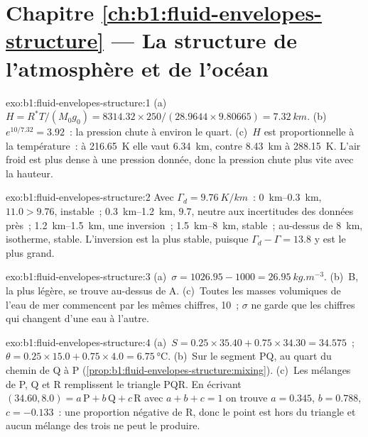 \section*{Chapitre \ref{ch:b1:fluid-envelopes-structure} --- La structure de l'atmosphère et de l'océan}

\begin{solution}{exo:b1:fluid-envelopes-structure:1}
(a)~$H = R^*T/(M_0 g_0) = 8314.32 \times 250/(28.9644 \times 9.80665) =
\qty{7.32}{km}$. (b)~$e^{10/7.32} = 3.92$~: la pression chute à environ le quart.
(c)~$H$ est proportionnelle à la température~: à \qty{216.65}{K} elle vaut
\qty{6.34}{km}, contre \qty{8.43}{km} à \qty{288.15}{K}. L'air froid est plus dense à
une pression donnée, donc la pression chute plus vite avec la hauteur.
\end{solution}

\begin{solution}{exo:b1:fluid-envelopes-structure:2}
Avec $\Gamma_d = \qty{9.76}{K/km}$~: \qtyrange{0}{0.3}{km}, $11.0 > 9.76$,
instable~; \qtyrange{0.3}{1.2}{km}, $9.7$, neutre aux incertitudes des
données près~; \qtyrange{1.2}{1.5}{km}, une inversion~; \qtyrange{1.5}{8}{km}, stable~;
au-dessus de \qty{8}{km}, isotherme, stable. L'inversion est la plus stable, puisque
$\Gamma_d - \Gamma = 13.8$ y est le plus grand.
\end{solution}

\begin{solution}{exo:b1:fluid-envelopes-structure:3}
(a)~$\sigma = 1026.95 - 1000 = \qty{26.95}{kg.m^{-3}}$. (b)~B, la plus légère, se trouve
au-dessus de A. (c)~Toutes les masses volumiques de l'eau de mer commencent par les mêmes chiffres, 10~; $\sigma$ ne garde
que les chiffres qui changent d'une eau à l'autre.
\end{solution}

\begin{solution}{exo:b1:fluid-envelopes-structure:4}
(a)~$S = 0.25 \times 35.40 + 0.75 \times 34.30 = 34.575$~; $\theta = 0.25 \times
15.0 + 0.75 \times 4.0 = \qty{6.75}{\celsius}$. (b)~Sur le segment PQ, au quart
du chemin de Q à P (\cref{prop:b1:fluid-envelopes-structure:mixing}).
(c)~Les mélanges de P, Q et R remplissent le triangle PQR. En écrivant
$(34.60, 8.0) = a\,\mathrm P + b\,\mathrm Q + c\,\mathrm R$ avec $a + b + c = 1$
on trouve $a = 0.345$, $b = 0.788$, $c = -0.133$~: une proportion négative de R, donc le
point est hors du triangle et aucun mélange des trois ne peut le produire.
\end{solution}

